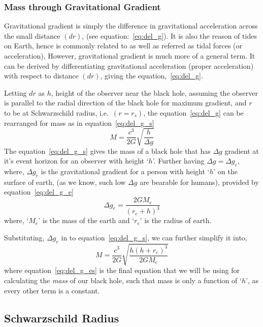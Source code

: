 \subsubsection{Mass through Gravitational Gradient}\label{subsubsec:m_gg}

Gravitational gradient is simply the difference in gravitational acceleration across the small distance \((dr)\), (see equation:~\ref{eq:del_g}). It is also the reason
of tides on Earth, hence is commonly related to as well as referred as tidal forces (or acceleration), However, gravitational gradient is much more of a general 
term. It can be derived by differentiating gravitational acceleration (proper acceleration) with respect to distance \((dr)\), giving the equation,~\ref{eq:del_g}. 

Letting \(dr\) as \(h\), height of the observer near the black hole, assuming the observer is parallel to the radial direction of the black hole for maximum gradient, 
and \(r\) to be at Schwarzschild radius, i.e.~\((r = r_s)\), the equation~\ref{eq:del_g} can be rearranged for mass as in equation~\ref{eq:del_g_s}
\begin{equation}\label{eq:del_g_s}
    M = \frac{c^3}{2G}\sqrt{\frac{h}{\Delta g}} \tag{3.4}
\end{equation}
The equation~\ref{eq:del_g_s} gives the mass of a black hole that has \(\Delta g\) gradient at it's event horizon for an observer with height `\(h\)'. Further 
having \(\Delta g = \Delta g_e\), where, \emph{\(\Delta g_e\)} is the gravitational gradient for a person with height `\(h\)' on the surface of earth, (as we
know, such low \(\Delta g\) are bearable for humans), provided by equation~\ref{eq:del_g_e}
\begin{equation}\label{eq:del_g_e}
    \Delta g_e = \frac{2GM_e}{(r_e + h)^3} \tag{3.5}
\end{equation}
where, `\(M_e\)' is the mass of the earth and `\(r_e\)' is the radius of earth. 

Substituting, \(\Delta g_e\) in to equation~\ref{eq:del_g_s}, we can further simplify it into, 
\begin{equation}\label{eq:del_g_es}
    M = \frac{c^3}{2G}\sqrt{\frac{h(h+r_e)^3}{2GM_e}} \tag{3.6}
\end{equation}
where equation~\ref{eq:del_g_es} is the final equation that we will be using for calculating the \emph{mass} of our black hole, such that mass is only a function 
of `\(h\)', as every other term is a constant. 

\subsection{Schwarzschild Radius}\label{subsec:Sch_rad}


